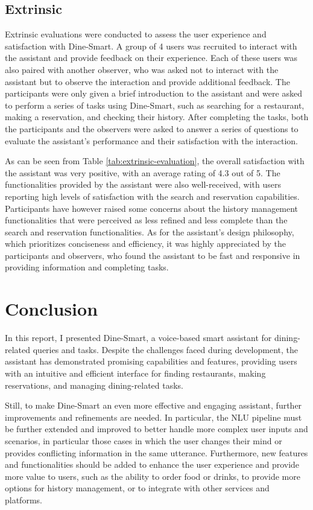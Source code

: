 \documentclass[twocolumn]{article}
\begin{document}
\subsection{Extrinsic}

Extrinsic evaluations were conducted to assess the user experience and satisfaction with Dine-Smart. A group of 4 users was recruited to interact with the assistant and provide feedback on their experience. Each of these users was also paired with another observer, who was asked not to interact with the assistant but to observe the interaction and provide additional feedback. The participants were only given a brief introduction to the assistant and were asked to perform a series of tasks using Dine-Smart, such as searching for a restaurant, making a reservation, and checking their history. After completing the tasks, both the participants and the observers were asked to answer a series of questions to evaluate the assistant's performance and their satisfaction with the interaction.

As can be seen from Table \ref{tab:extrinsic-evaluation}, the overall satisfaction with the assistant was very positive, with an average rating of 4.3 out of 5. The functionalities provided by the assistant were also well-received, with users reporting high levels of satisfaction with the search and reservation capabilities. Participants have however raised some concerns about the history management functionalities that were perceived as less refined and less complete than the search and reservation functionalities. As for the assistant's design philosophy, which prioritizes conciseness and efficiency, it was highly appreciated by the participants and observers, who found the assistant to be fast and responsive in providing information and completing tasks.

\section{Conclusion}

In this report, I presented Dine-Smart, a voice-based smart assistant for dining-related queries and tasks. Despite the challenges faced during development, the assistant has demonstrated promising capabilities and features, providing users with an intuitive and efficient interface for finding restaurants, making reservations, and managing dining-related tasks.

Still, to make Dine-Smart an even more effective and engaging assistant, further improvements and refinements are needed. In particular, the NLU pipeline must be further extended and improved to better handle more complex user inputs and scenarios, in particular those cases in which the user changes their mind or provides conflicting information in the same utterance. Furthermore, new features and functionalities should be added to enhance the user experience and provide more value to users, such as the ability to order food or drinks, to provide more options for history management, or to integrate with other services and platforms.
\end{document}
